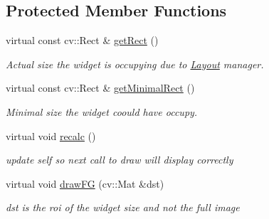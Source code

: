 \subsection*{Protected Member Functions}
\begin{DoxyCompactItemize}
\item 
virtual const cv\+::\+Rect \& \hyperlink{classcanvascv_1_1MatWidget_a318736f6602bc2fccc7758be88ca3c4d}{get\+Rect} ()\hypertarget{classcanvascv_1_1MatWidget_a318736f6602bc2fccc7758be88ca3c4d}{}\label{classcanvascv_1_1MatWidget_a318736f6602bc2fccc7758be88ca3c4d}

\begin{DoxyCompactList}\small\item\em Actual size the widget is occupying due to \hyperlink{classcanvascv_1_1Layout}{Layout} manager. \end{DoxyCompactList}\item 
virtual const cv\+::\+Rect \& \hyperlink{classcanvascv_1_1MatWidget_a8348b409495b367b48f297cef4c577c0}{get\+Minimal\+Rect} ()\hypertarget{classcanvascv_1_1MatWidget_a8348b409495b367b48f297cef4c577c0}{}\label{classcanvascv_1_1MatWidget_a8348b409495b367b48f297cef4c577c0}

\begin{DoxyCompactList}\small\item\em Minimal size the widget coould have occupy. \end{DoxyCompactList}\item 
virtual void \hyperlink{classcanvascv_1_1MatWidget_a01c9f938495de6c6d99ef6d41c925c21}{recalc} ()\hypertarget{classcanvascv_1_1MatWidget_a01c9f938495de6c6d99ef6d41c925c21}{}\label{classcanvascv_1_1MatWidget_a01c9f938495de6c6d99ef6d41c925c21}

\begin{DoxyCompactList}\small\item\em update self so next call to \textquotesingle{}draw\textquotesingle{} will display correctly \end{DoxyCompactList}\item 
virtual void \hyperlink{classcanvascv_1_1MatWidget_abea96f3d0ef3407bc63b112624756247}{draw\+FG} (cv\+::\+Mat \&dst)\hypertarget{classcanvascv_1_1MatWidget_abea96f3d0ef3407bc63b112624756247}{}\label{classcanvascv_1_1MatWidget_abea96f3d0ef3407bc63b112624756247}

\begin{DoxyCompactList}\small\item\em dst is the roi of the widget size and not the full image \end{DoxyCompactList}\end{DoxyCompactItemize}
